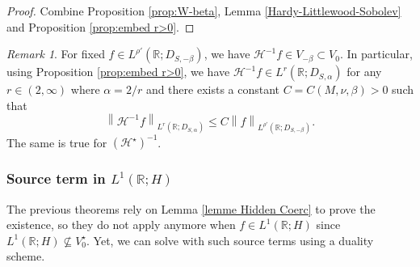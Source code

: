 \documentclass[11pt, letterpaper]{amsart}
\theoremstyle{definition}
\theoremstyle{remark}
\newtheorem{rem}[thm]{Remark}
\numberwithin{equation}{section}
\begin{document}
{\begin{proof}
 Combine Proposition \ref{prop:W-beta}, Lemma \ref{Hardy-Littlewood-Sobolev} and Proposition \ref{prop:embed r>0}.
\end{proof}
\begin{rem}
   For fixed $f\in L^{\rho'}(\mathbb{R};D_{S,-\beta})$, we have $\mathcal{H}^{-1}f \in V_{-\beta} \subset V_0$. In particular, using Proposition \ref{prop:embed r>0}, we have $\mathcal{H}^{-1}f \in L^r(\mathbb{R};D_{S,\alpha})$ for any $ r\in (2,\infty)$ where $\alpha={2}/{r} $ and there exists a constant $C=C(M,\nu,\beta)>0$ such that 
$$ \left \| \mathcal{H}^{-1}f \right \|_{L^r(\mathbb{R};D_{S,\alpha})}\leq C\left \| f \right \|_{L^{\rho'}(\mathbb{R};D_{S,-\beta})}.$$ 
The same is true for $(\mathcal{H}^\star)^{-1}$.
\end{rem}

}

\subsubsection{Source term in $L^1(\mathbb{R};H)$}
The previous theorems rely on Lemma \ref{lemme Hidden Coerc} to prove the existence, so they do not apply anymore when $f \in L^1(\mathbb{R};H)$ since $L^1(\mathbb{R};H) \nsubseteq  V_0^\star$. Yet, we can solve with such source terms using a duality scheme.
 
\end{document}
